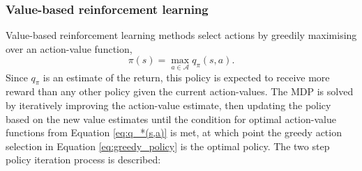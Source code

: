 \subsubsection{Value-based reinforcement learning}
\label{sec:value_based_rl}

Value-based reinforcement learning methods select actions by greedily maximising over an action-value function, 
\begin{equation}
    \pi(s) = \max_{a \in \mathcal{A}} q_\pi(s,a).
    \label{eq:greedy_policy}
\end{equation}
Since $q_\pi$ is an estimate of the return, this policy is expected to receive more reward than any other policy given the current action-values. The MDP is solved by iteratively improving the action-value estimate, then updating the policy based on the new value estimates until the condition for optimal action-value functions from Equation \ref{eq:q_*(s,a)} is met, at which point the greedy action selection in Equation \ref{eq:greedy_policy} is the optimal policy. The two step policy iteration process is described:

